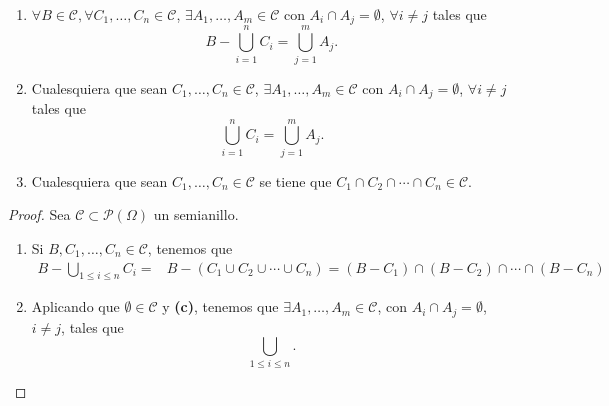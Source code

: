\begin{prop}
\begin{enumerate}
\item $\displaystyle \forall B \in \mathcal{C}, \forall C_{1}, \ldots, C_{n} \in \mathcal{C} $, $\displaystyle \exists A_{1}, \ldots, A_{m} \in \mathcal{C} $ con $\displaystyle A_{i} \cap A_{j} = \emptyset $, $\displaystyle \forall i \neq j $ tales que 
	\[B - \bigcup_{i = 1}^{n}C_{i} = \bigcup_{j = 1}^{m}A_{j} .\]
\item Cualesquiera que sean $\displaystyle C_{1}, \ldots, C_{n} \in \mathcal{C} $, $\displaystyle \exists A_{1}, \ldots, A_{m} \in \mathcal{C} $ con $\displaystyle A_{i} \cap A_{j} = \emptyset $, $\displaystyle \forall i \neq j $ tales que
	\[\bigcup_{i = 1}^{n}C_{i} = \bigcup_{j = 1}^{m}A_{j} .\]
\item Cualesquiera que sean $\displaystyle C_{1}, \ldots, C_{n} \in \mathcal{C} $ se tiene que $\displaystyle C_{1} \cap C_{2} \cap \cdots \cap C_{n} \in \mathcal{C} $.
\end{enumerate}
\end{prop}
\begin{proof}
Sea $\displaystyle \mathcal{C} \subset \mathcal{P}\left(\Omega \right) $ un semianillo.
\begin{enumerate}
\item Si $\displaystyle B, C_{1}, \ldots, C_{n} \in \mathcal{C} $, tenemos que 
\[
\begin{split}
	B - \bigcup_{1 \leq i \leq n}C_{i} = & B - \left(C_{1} \cup C_{2} \cup \cdots \cup C_{n}\right) = \left(B - C_{1}\right) \cap \left(B - C_{2}\right) \cap \cdots \cap \left(B - C_{n}\right) 
\end{split}
\]
\item Aplicando que $\displaystyle \emptyset \in \mathcal{C} $ y \textbf{(c)}, tenemos que $\displaystyle \exists A_{1}, \ldots, A_{m} \in \mathcal{C} $, con $\displaystyle A_{i} \cap A_{j}  = \emptyset $, $\displaystyle i \neq j $, tales que 
	\[\bigcup_{1 \leq i \leq n} .\]
\end{enumerate}

\end{proof}

